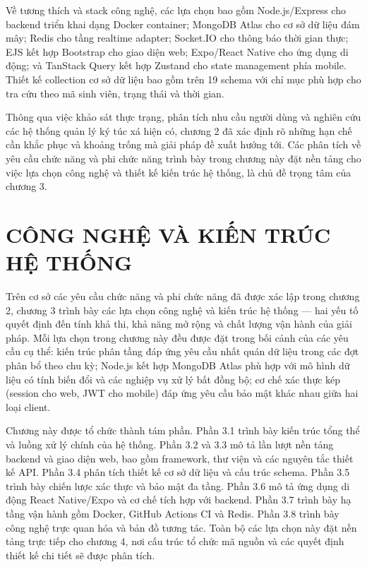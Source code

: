 ﻿\documentclass[a4paper,12pt,openany,oneside]{report}
\begin{document}
Về tương thích và stack công nghệ, các lựa chọn bao gồm Node.js/Express cho
backend triển khai dạng Docker container; MongoDB Atlas cho cơ sở dữ liệu đám
mây; Redis cho tầng realtime adapter; Socket.IO cho thông báo thời gian thực;
EJS kết hợp Bootstrap cho giao diện web; Expo/React Native cho ứng dụng di
động; và TanStack Query kết hợp Zustand cho state management phía mobile. Thiết
kế collection cơ sở dữ liệu bao gồm trên 19 schema với chỉ mục phù hợp cho tra
cứu theo mã sinh viên, trạng thái và thời gian.

Thông qua việc khảo sát thực trạng, phân tích nhu cầu người dùng và nghiên cứu
các hệ thống quản lý ký túc xá hiện có, chương 2 đã xác định rõ những hạn chế
cần khắc phục và khoảng trống mà giải pháp đề xuất hướng tới. Các phân tích về
yêu cầu chức năng và phi chức năng trình bày trong chương này đặt nền tảng cho
việc lựa chọn công nghệ và thiết kế kiến trúc hệ thống, là chủ đề trọng tâm
của chương 3.

\clearpage
\chapter{CÔNG NGHỆ VÀ KIẾN TRÚC HỆ THỐNG}

Trên cơ sở các yêu cầu chức năng và phi chức năng đã được xác lập trong chương 2,
chương 3 trình bày các lựa chọn công nghệ và kiến trúc hệ thống --- hai yếu tố
quyết định đến tính khả thi, khả năng mở rộng và chất lượng vận hành của giải
pháp. Mỗi lựa chọn trong chương này đều được đặt trong bối cảnh của các yêu
cầu cụ thể: kiến trúc phân tầng đáp ứng yêu cầu nhất quán dữ liệu trong các
đợt phân bổ theo chu kỳ; Node.js kết hợp MongoDB Atlas phù hợp với mô hình dữ
liệu có tính biến đổi và các nghiệp vụ xử lý bất đồng bộ; cơ chế xác thực kép
(session cho web, JWT cho mobile) đáp ứng yêu cầu bảo mật khác nhau giữa hai
loại client.

Chương này được tổ chức thành tám phần. Phần 3.1 trình bày kiến trúc tổng thể
và luồng xử lý chính của hệ thống. Phần 3.2 và 3.3 mô tả lần lượt nền tảng
backend và giao diện web, bao gồm framework, thư viện và các nguyên tắc thiết
kế API. Phần 3.4 phân tích thiết kế cơ sở dữ liệu và cấu trúc schema. Phần 3.5
trình bày chiến lược xác thực và bảo mật đa tầng. Phần 3.6 mô tả ứng dụng di
động React Native/Expo và cơ chế tích hợp với backend. Phần 3.7 trình bày hạ
tầng vận hành gồm Docker, GitHub Actions CI và Redis. Phần 3.8 trình bày công
nghệ trực quan hóa và bản đồ tương tác. Toàn bộ các lựa chọn này đặt nền tảng
trực tiếp cho chương 4, nơi cấu trúc tổ chức mã nguồn và các quyết định thiết
kế chi tiết sẽ được phân tích.
\end{document}
